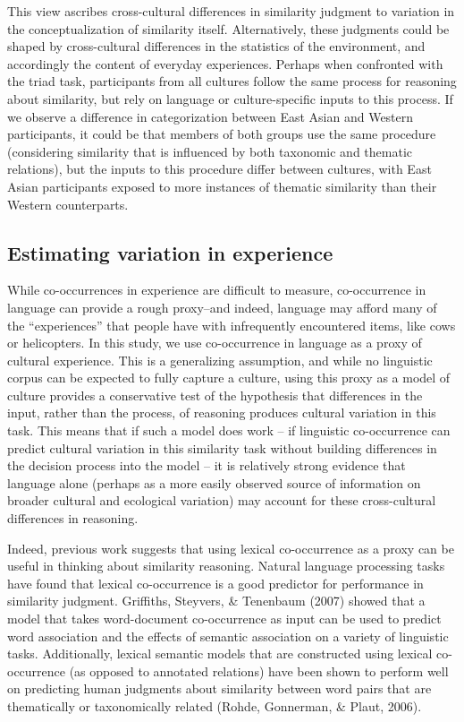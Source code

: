 \documentclass[10pt, letterpaper]{article}
\begin{document}
This view ascribes cross-cultural differences in similarity judgment to
variation in the conceptualization of similarity itself. Alternatively,
these judgments could be shaped by cross-cultural differences in the
statistics of the environment, and accordingly the content of everyday
experiences. Perhaps when confronted with the triad task, participants
from all cultures follow the same process for reasoning about
similarity, but rely on language or culture-specific inputs to this
process. If we observe a difference in categorization between East Asian
and Western participants, it could be that members of both groups use
the same procedure (considering similarity that is influenced by both
taxonomic and thematic relations), but the inputs to this procedure
differ between cultures, with East Asian participants exposed to more
instances of thematic similarity than their Western counterparts.

\hypertarget{estimating-variation-in-experience}{%
\subsection{Estimating variation in
experience}\label{estimating-variation-in-experience}}

While co-occurrences in experience are difficult to measure,
co-occurrence in language can provide a rough proxy--and indeed,
language may afford many of the ``experiences'' that people have with
infrequently encountered items, like cows or helicopters. In this study,
we use co-occurrence in language as a proxy of cultural experience. This
is a generalizing assumption, and while no linguistic corpus can be
expected to fully capture a culture, using this proxy as a model of
culture provides a conservative test of the hypothesis that differences
in the input, rather than the process, of reasoning produces cultural
variation in this task. This means that if such a model does work -- if
linguistic co-occurrence can predict cultural variation in this
similarity task without building differences in the decision process
into the model -- it is relatively strong evidence that language alone
(perhaps as a more easily observed source of information on broader
cultural and ecological variation) may account for these cross-cultural
differences in reasoning.

Indeed, previous work suggests that using lexical co-occurrence as a
proxy can be useful in thinking about similarity reasoning. Natural
language processing tasks have found that lexical co-occurrence is a
good predictor for performance in similarity judgment. Griffiths,
Steyvers, \& Tenenbaum (2007) showed that a model that takes
word-document co-occurrence as input can be used to predict word
association and the effects of semantic association on a variety of
linguistic tasks. Additionally, lexical semantic models that are
constructed using lexical co-occurrence (as opposed to annotated
relations) have been shown to perform well on predicting human judgments
about similarity between word pairs that are thematically or
taxonomically related (Rohde, Gonnerman, \& Plaut, 2006).
\end{document}
